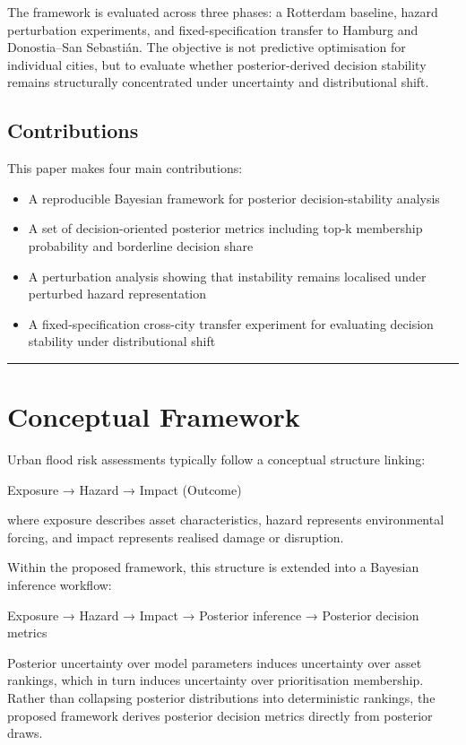 \documentclass[
]{article}
\providecommand{\tightlist}{%
  \setlength{\itemsep}{0pt}\setlength{\parskip}{0pt}}
\begin{document}
The framework is evaluated across three phases: a Rotterdam baseline,
hazard perturbation experiments, and fixed-specification transfer to
Hamburg and Donostia–San Sebastián. The objective is not predictive
optimisation for individual cities, but to evaluate whether
posterior-derived decision stability remains structurally concentrated
under uncertainty and distributional shift.

\subsection{Contributions}\label{contributions}

This paper makes four main contributions:

\begin{itemize}
\tightlist
\item
  A reproducible Bayesian framework for posterior decision-stability
  analysis
\item
  A set of decision-oriented posterior metrics including top-k
  membership probability and borderline decision share
\item
  A perturbation analysis showing that instability remains localised
  under perturbed hazard representation
\item
  A fixed-specification cross-city transfer experiment for evaluating
  decision stability under distributional shift
\end{itemize}

\begin{center}\rule{0.5\linewidth}{0.5pt}\end{center}

\section{Conceptual Framework}\label{conceptual-framework}

Urban flood risk assessments typically follow a conceptual structure
linking:

Exposure → Hazard → Impact (Outcome)

where exposure describes asset characteristics, hazard represents
environmental forcing, and impact represents realised damage or
disruption.

Within the proposed framework, this structure is extended into a
Bayesian inference workflow:

Exposure → Hazard → Impact → Posterior inference → Posterior decision
metrics

Posterior uncertainty over model parameters induces uncertainty over
asset rankings, which in turn induces uncertainty over prioritisation
membership. Rather than collapsing posterior distributions into
deterministic rankings, the proposed framework derives posterior
decision metrics directly from posterior draws.
\end{document}
